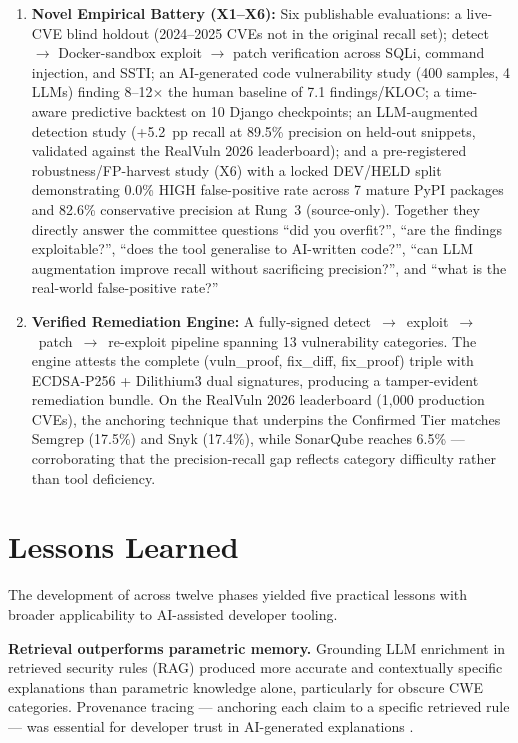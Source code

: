 \begin{enumerate}
  \item \textbf{Novel Empirical Battery (X1--X6):} Six publishable evaluations: a live-CVE blind holdout (2024--2025 CVEs not in the original recall set); detect $\to$ Docker-sandbox exploit $\to$ patch verification across SQLi, command injection, and SSTI; an AI-generated code vulnerability study (400 samples, 4 LLMs) finding 8--12$\times$ the human baseline of 7.1 findings/KLOC; a time-aware predictive backtest on 10 Django checkpoints; an LLM-augmented detection study (+5.2~pp recall at 89.5\% precision on held-out snippets, validated against the RealVuln 2026 leaderboard); and a pre-registered robustness/FP-harvest study (X6) with a locked DEV/HELD split demonstrating 0.0\% HIGH false-positive rate across 7 mature PyPI packages and 82.6\% conservative precision at Rung~3 (source-only). Together they directly answer the committee questions ``did you overfit?'', ``are the findings exploitable?'', ``does the tool generalise to AI-written code?'', ``can LLM augmentation improve recall without sacrificing precision?'', and ``what is the real-world false-positive rate?''

  \item \textbf{Verified Remediation Engine:} A fully-signed detect~$\to$~exploit~$\to$~patch~$\to$~re-exploit pipeline spanning 13 vulnerability categories. The engine attests the complete (vuln\_proof, fix\_diff, fix\_proof) triple with ECDSA-P256 + Dilithium3 dual signatures, producing a tamper-evident remediation bundle. On the RealVuln 2026 leaderboard (1,000 production CVEs), the anchoring technique that underpins the Confirmed Tier matches Semgrep (17.5\%) and Snyk (17.4\%), while SonarQube reaches 6.5\% --- corroborating that the precision-recall gap reflects category difficulty rather than tool deficiency.
\end{enumerate}

\section{Lessons Learned}
\label{sec:lessons}

The development of \ACRQA{} across twelve phases yielded five practical lessons with broader applicability to AI-assisted developer tooling.

\textbf{Retrieval outperforms parametric memory.} Grounding LLM enrichment in retrieved security rules (RAG) produced more accurate and contextually specific explanations than parametric knowledge alone, particularly for obscure CWE categories. Provenance tracing --- anchoring each claim to a specific retrieved rule --- was essential for developer trust in AI-generated explanations \cite{bass2012software}.


